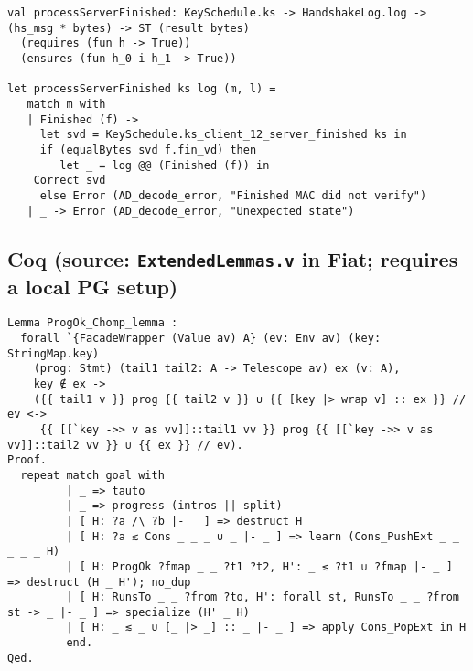 \documentclass{article}
\begin{document}
\begin{verbatim}
val processServerFinished: KeySchedule.ks -> HandshakeLog.log -> (hs_msg * bytes) -> ST (result bytes)
  (requires (fun h -> True))
  (ensures (fun h_0 i h_1 -> True))

let processServerFinished ks log (m, l) =
   match m with
   | Finished (f) ->
     let svd = KeySchedule.ks_client_12_server_finished ks in
     if (equalBytes svd f.fin_vd) then
        let _ = log @@ (Finished (f)) in
    Correct svd
     else Error (AD_decode_error, "Finished MAC did not verify")
   | _ -> Error (AD_decode_error, "Unexpected state")
\end{verbatim}

\subsection*{Coq (source: \texttt{ExtendedLemmas.v} in Fiat; requires a local PG setup)}

\begin{verbatim}
Lemma ProgOk_Chomp_lemma :
  forall `{FacadeWrapper (Value av) A} (ev: Env av) (key: StringMap.key)
    (prog: Stmt) (tail1 tail2: A -> Telescope av) ex (v: A),
    key ∉ ex ->
    ({{ tail1 v }} prog {{ tail2 v }} ∪ {{ [key |> wrap v] :: ex }} // ev <->
     {{ [[`key ->> v as vv]]::tail1 vv }} prog {{ [[`key ->> v as vv]]::tail2 vv }} ∪ {{ ex }} // ev).
Proof.
  repeat match goal with
         | _ => tauto
         | _ => progress (intros || split)
         | [ H: ?a /\ ?b |- _ ] => destruct H
         | [ H: ?a ≲ Cons _ _ _ ∪ _ |- _ ] => learn (Cons_PushExt _ _ _ _ _ H)
         | [ H: ProgOk ?fmap _ _ ?t1 ?t2, H': _ ≲ ?t1 ∪ ?fmap |- _ ] => destruct (H _ H'); no_dup
         | [ H: RunsTo _ _ ?from ?to, H': forall st, RunsTo _ _ ?from st -> _ |- _ ] => specialize (H' _ H)
         | [ H: _ ≲ _ ∪ [_ |> _] :: _ |- _ ] => apply Cons_PopExt in H
         end.
Qed.
\end{verbatim}
\end{document}
